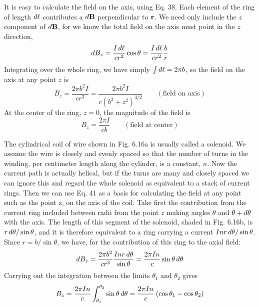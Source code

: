 It is easy to calculate the field on the axis, using Eq. 38. Each element
of the ring of length $\mathop{d\!}\ell$ contributes a $\mathop{d\!}\mathbf{B}$ perpendicular to $\mathbf{r}$. We
need only include the $z$ component of $\mathop{d\!}\mathbf{B}$, for we know the total field
on the axis must point in the $z$ direction,
\begin{equation}
  \mathop{d\!} B_z = \frac{I\mathop{d\!}\ell}{cr^2} \cos\theta = \frac{I\mathop{d\!}\ell}{cr^2} \frac{b}{r}
\end{equation}
Integrating over the whole ring, we have simply $\int\mathop{d\!}\ell = 2\pi b$, so the
field on the axis at any point $z$ is
\begin{equation}
  B_z = \frac{2\pi b^2I}{cr^3} = \frac{2\pi b^2I}{c(b^2+z^2)^{3/2}}
           \qquad (\text{field on axis})
\end{equation}
At the center of the ring, $z=0$, the magnitude of the field is
\begin{equation}
  B_z = \frac{2\pi I}{cb}
           \qquad (\text{field at center})
\end{equation}

The cylindrical coil of wire shown in Fig. 6.16a is usually called a
solenoid. We assume the wire is closely and evenly spaced so that
the number of turns in the winding, per centimeter length along the
cylinder, is a constant, $n$. Now the current path is actually helical,
but if the turns are many and closely spaced we can ignore this and
regard the whole solenoid as equivalent to a stack of current rings.
Then we can use Eq. 41 as a basis for calculating the field at any point
such as the point z, on the axis of the coil. Take first the contribution
from the current ring included between radii from the point $z$ making
angles $\theta$ and $\theta+\mathop{d\!}\theta$ with the axis. The length of this segment of the
solenoid, shaded in Fig. 6.16b, is $r\mathop{d\!}\theta/\sin\theta$, and it is therefore equivalent
to a ring carrying a current $Inr \mathop{d\!}\theta/ \sin \theta$. Since $r = b/ \sin\theta$, we
have, for the contribution of this ring to the axial field:
\begin{equation}
  \mathop{d\!} B_z = \frac{2\pi b^2}{cr^3}\frac{Inr\mathop{d\!}\theta}{\sin\theta}
            = \frac{2\pi I n}{c} \sin\theta\mathop{d\!}\theta
\end{equation}
Carrying out the integration between the limits $\theta_1$ and $\theta_2$ gives
\begin{equation}
  B_z = \frac{2\pi I n}{c} \int_{\theta_1}^{\theta_2} \sin\theta\mathop{d\!}\theta
      = \frac{2\pi I n}{c}\:(\cos\theta_1 - \cos\theta_2)
\end{equation}

